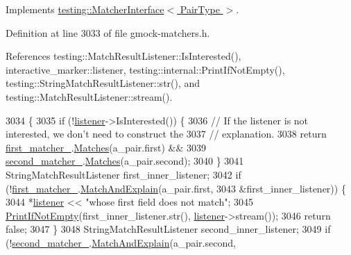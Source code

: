 Implements \hyperlink{classtesting_1_1MatcherInterface_a296b43607cd99d60365f0e6a762777cf}{testing\+::\+Matcher\+Interface$<$ Pair\+Type $>$}.



Definition at line 3033 of file gmock-\/matchers.\+h.



References testing\+::\+Match\+Result\+Listener\+::\+Is\+Interested(), interactive\+\_\+marker\+::listener, testing\+::internal\+::\+Print\+If\+Not\+Empty(), testing\+::\+String\+Match\+Result\+Listener\+::str(), and testing\+::\+Match\+Result\+Listener\+::stream().


\begin{DoxyCode}
3034                                                                     \{
3035     \textcolor{keywordflow}{if} (!\hyperlink{namespaceinteractive__marker_a0e579ab555212bb5e2c9f8a675b7618a}{listener}->IsInterested()) \{
3036       \textcolor{comment}{// If the listener is not interested, we don't need to construct the}
3037       \textcolor{comment}{// explanation.}
3038       \textcolor{keywordflow}{return} \hyperlink{classtesting_1_1internal_1_1PairMatcherImpl_a70e5a952ffd16886f5f1bacc718561f8}{first\_matcher\_}.\hyperlink{classtesting_1_1internal_1_1MatcherBase_a3b479673ff40cac1a7d548e91d789cb2}{Matches}(a\_pair.first) &&
3039              \hyperlink{classtesting_1_1internal_1_1PairMatcherImpl_a2341ad72afa02dcadb98c531cada3576}{second\_matcher\_}.\hyperlink{classtesting_1_1internal_1_1MatcherBase_a3b479673ff40cac1a7d548e91d789cb2}{Matches}(a\_pair.second);
3040     \}
3041     StringMatchResultListener first\_inner\_listener;
3042     \textcolor{keywordflow}{if} (!\hyperlink{classtesting_1_1internal_1_1PairMatcherImpl_a70e5a952ffd16886f5f1bacc718561f8}{first\_matcher\_}.\hyperlink{classtesting_1_1internal_1_1MatcherBase_a08429a6d7e7d330de4a4eb4e272105a7}{MatchAndExplain}(a\_pair.first,
3043                                         &first\_inner\_listener)) \{
3044       *\hyperlink{namespaceinteractive__marker_a0e579ab555212bb5e2c9f8a675b7618a}{listener} << \textcolor{stringliteral}{"whose first field does not match"};
3045       \hyperlink{namespacetesting_1_1internal_afa4cd5d7933878d6d820b32c87bb2767}{PrintIfNotEmpty}(first\_inner\_listener.str(), \hyperlink{namespaceinteractive__marker_a0e579ab555212bb5e2c9f8a675b7618a}{listener}->stream());
3046       \textcolor{keywordflow}{return} \textcolor{keyword}{false};
3047     \}
3048     StringMatchResultListener second\_inner\_listener;
3049     \textcolor{keywordflow}{if} (!\hyperlink{classtesting_1_1internal_1_1PairMatcherImpl_a2341ad72afa02dcadb98c531cada3576}{second\_matcher\_}.\hyperlink{classtesting_1_1internal_1_1MatcherBase_a08429a6d7e7d330de4a4eb4e272105a7}{MatchAndExplain}(a\_pair.second,

\end{DoxyCode}
